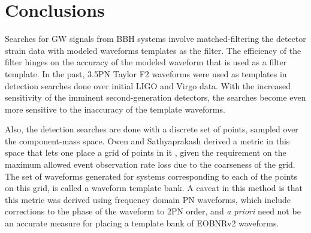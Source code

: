 \documentclass[aps,
prd,
amsmath,
amssymb,
twocolumn,
floatfix,
groupedaddress]{revtex4-1}
\newcommand{\FF}{\mathcal{FF}}
\begin{document}
\section{Conclusions}\label{sec:level1:conclusion}

Searches for GW signals from BBH systems involve matched-filtering the detector strain data with modeled waveforms templates as the filter. The efficiency of the filter hinges on the accuracy of the modeled waveform that is used as a filter template. In the past, 3.5PN Taylor F2 waveforms were used as templates in detection searches done over initial LIGO and Virgo data. With the increased sensitivity of the imminent second-generation detectors, the searches become even more sensitive to the inaccuracy of the template waveforms. 

Also, the detection searches are done with a discrete set of points, sampled over the component-mass space. Owen and Sathyaprakash \citep{OwenTemplateSpacing,SathyaMetric2PN,SathyaBankPlacementTauN} derived a metric in this space that lets one place a grid of points in it \citep{BabaketalBankPlacement}, given the requirement on the maximum allowed event observation rate loss due to the coarseness of the grid. The set of waveforms generated for systems corresponding to each of the points on this grid, is called a waveform template bank. A caveat in this method is that this metric was derived using frequency domain PN waveforms, which include corrections to the phase of the waveform to 2PN order, and \textit{a priori} need not be an accurate measure for placing a template bank of EOBNRv2 waveforms.
\end{document}
